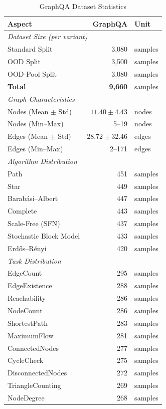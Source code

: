 \begin{table}[h]
\centering
\caption{GraphQA Dataset Statistics}
\label{tab:graphqa_unified}
\begin{tabular}{lrl}
\toprule
\textbf{Aspect} & \textbf{GraphQA} & \textbf{Unit} \\
\midrule
\multicolumn{3}{l}{\textit{Dataset Size (per variant)}} \\
Standard Split & 3,080 & samples \\
OOD Split & 3,500 & samples \\
OOD-Pool Split & 3,080 & samples \\
\textbf{Total} & \textbf{9,660} & samples \\
\midrule
\multicolumn{3}{l}{\textit{Graph Characteristics}} \\
Nodes (Mean $\pm$ Std) & $11.40 \pm 4.43$ & nodes \\
Nodes (Min--Max) & 5--19 & nodes \\
Edges (Mean $\pm$ Std) & $28.72 \pm 32.46$ & edges \\
Edges (Min--Max) & 2--171 & edges \\
\midrule
\multicolumn{3}{l}{\textit{Algorithm Distribution}} \\
Path & 451 & samples \\
Star & 449 & samples \\
Barab\'asi--Albert & 447 & samples \\
Complete & 443 & samples \\
Scale-Free (SFN) & 437 & samples \\
Stochastic Block Model & 433 & samples \\
Erd\H{o}s--R\'enyi & 420 & samples \\
\midrule
\multicolumn{3}{l}{\textit{Task Distribution}} \\
EdgeCount & 295 & samples \\
EdgeExistence & 288 & samples \\
Reachability & 286 & samples \\
NodeCount & 286 & samples \\
ShortestPath & 283 & samples \\
MaximumFlow & 281 & samples \\
ConnectedNodes & 277 & samples \\
CycleCheck & 275 & samples \\
DisconnectedNodes & 272 & samples \\
TriangleCounting & 269 & samples \\
NodeDegree & 268 & samples \\

\end{tabular}
\end{table}
